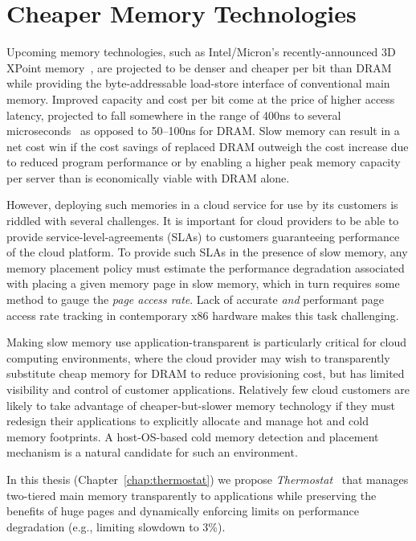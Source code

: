 \section{Cheaper Memory Technologies}
Upcoming memory technologies, such as Intel/Micron's recently-announced 3D
XPoint memory~\cite{3dcrosspoint}, are projected to be denser and cheaper per
bit than DRAM while providing the byte-addressable load-store interface of
conventional main memory.  Improved capacity and cost per bit come at the price
of higher access latency, projected to fall somewhere in the range of 400ns to
several microseconds~\cite{3dcrosspoint} as opposed to 50--100ns for DRAM.  Slow
memory can result in a net cost win if the cost savings of replaced DRAM
outweigh the cost increase due to reduced program performance or by enabling a
higher peak memory capacity per server than is economically viable with DRAM
alone.

However, deploying such memories in a cloud service for use by its customers is
riddled with several challenges. It is important for cloud providers to be able
to provide service-level-agreements (SLAs) to customers guaranteeing performance
of the cloud platform. To provide such SLAs in the presence of slow memory, any
memory placement policy must estimate the performance degradation associated
with placing a given memory page in slow memory, which in turn requires some
method to gauge the {\it page access rate}. Lack of accurate \textit{and}
performant page access rate tracking in contemporary x86 hardware makes this
task challenging.

Making slow memory use application-transparent is particularly critical for
cloud computing environments, where the cloud provider may wish to transparently
substitute cheap memory for DRAM to reduce provisioning cost, but has limited
visibility and control of customer applications.  Relatively few cloud customers
are likely to take advantage of cheaper-but-slower memory technology if they
must redesign their applications to explicitly allocate and manage hot and cold
memory footprints. A host-OS-based cold memory detection and placement mechanism
is a natural candidate for such an environment.

In this thesis (Chapter~\ref{chap:thermostat}) we propose {\it
Thermostat}~\cite{ref:agarwal:asplos2017:thermostat} that manages two-tiered
main memory transparently to applications while preserving the benefits of huge
pages and dynamically enforcing limits on performance degradation (e.g.,
limiting slowdown to 3\%).

